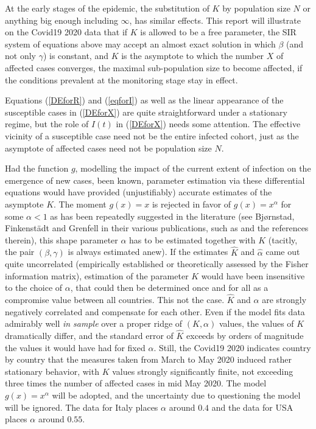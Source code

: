 \documentclass{article}
\begin{document}
\bigskip

At the early stages of the epidemic, the substitution of $K$ by population size $N$ or anything big enough including $\infty$, has similar effects. This report will illustrate on the Covid19 2020 data that if $K$ is allowed to be a free parameter, the SIR system of equations above may accept an almost exact solution in which $\beta$ (and not only $\gamma$) is constant, and $K$ is the asymptote to which the number $X$ of affected cases converges, the maximal sub-population size to become affected, if the conditions prevalent at the monitoring stage stay in effect.

Equations (\ref{DEforR}) and (\ref{eqforI}) as well as the linear appearance of the susceptible cases in (\ref{DEforX}) are quite straightforward under a stationary regime, but the role of $I(t)$ in (\ref{DEforX}) needs some attention. The effective vicinity of a susceptible case need not be the entire infected cohort, just as the asymptote of affected cases need not be population size $N$.

Had the function $g$, modelling the impact of the current extent of infection on the emergence of new cases, been known, parameter estimation via these differential equations would have provided (unjustifiably) accurate estimates of the asymptote $K$. The moment $g(x)=x$ is rejected in favor of $g(x)=x^\alpha$ for some $\alpha<1$ as has been repeatedly suggested in the literature (see Bj{\o}rnstad, Finkenst\"{a}dt and Grenfell in their various publications, such as \cite{AAA} and the references therein), this shape parameter $\alpha$ has to be estimated together with $K$ (tacitly, the pair $(\beta, \gamma)$ is always estimated anew). If the estimates $\hat{K}$ and $\hat{\alpha}$ came out quite uncorrelated (empirically established or theoretically assessed by the Fisher information matrix), estimation of the parameter $K$ would have been insensitive to the choice of $\alpha$, that could then be determined once and for all as a compromise value between all countries. This not the case. $\hat{K}$ and $\hat{\alpha}$ are strongly negatively correlated and compensate for each other. Even if the model fits data admirably well {\em in sample} over a proper ridge of $(K,\alpha)$ values, the values of $K$ dramatically differ, and the standard error of $\hat{K}$ exceeds by orders of magnitude the values it would have had for fixed $\alpha$. Still, the Covid19 2020 indicates country by country that the measures taken from March to May 2020 induced rather stationary behavior, with $K$ values strongly significantly finite, not exceeding three times the number of affected cases in mid May 2020. The model $g(x)=x^\alpha$ will be adopted, and the uncertainty due to questioning the model will be ignored. The data for Italy places $\alpha$ around $0.4$ and the data for USA places $\alpha$ around $0.55$.
\end{document}
